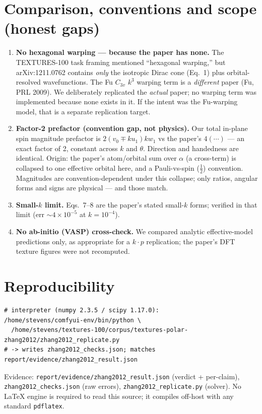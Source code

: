 \documentclass[11pt]{article}
\begin{document}
\section{Comparison, conventions and scope (honest gaps)}
\begin{enumerate}
\item \textbf{No hexagonal warping --- because the paper has none.} The TEXTURES-100 task
framing mentioned ``hexagonal warping,'' but arXiv:1211.0762 contains \emph{only} the
isotropic Dirac cone (Eq.~1) plus orbital-resolved wavefunctions. The Fu $C_{3v}$ $k^3$
warping term is a \emph{different} paper (Fu, PRL 2009). We deliberately replicated the
\emph{actual} paper; no warping term was implemented because none exists in it. If the
intent was the Fu-warping model, that is a separate replication target.
\item \textbf{Factor-2 prefactor (convention gap, not physics).} Our total in-plane spin
magnitude prefactor is $2(v_0\mp ku_1)kw_1$ vs the paper's $4(\cdots)$ --- an exact factor
of 2, constant across $k$ and $\theta$. Direction and handedness are identical. Origin: the
paper's atom/orbital sum over $\alpha$ (a cross-term) is collapsed to one effective orbital
here, and a Pauli-vs-spin ($\tfrac12$) convention. Magnitudes are convention-dependent under
this collapse; only ratios, angular forms and signs are physical --- and those match.
\item \textbf{Small-$k$ limit.} Eqs.~7--8 are the paper's stated small-$k$ forms; verified in
that limit (err $\sim4\times10^{-5}$ at $k=10^{-4}$).
\item \textbf{No ab-initio (VASP) cross-check.} We compared analytic effective-model
predictions only, as appropriate for a $k\!\cdot\!p$ replication; the paper's DFT texture
figures were not recomputed.
\end{enumerate}

\section{Reproducibility}
\begin{verbatim}
# interpreter (numpy 2.3.5 / scipy 1.17.0):
/home/stevens/comfyui-env/bin/python \
  /home/stevens/textures-100/corpus/textures-polar-zhang2012/zhang2012_replicate.py
# -> writes zhang2012_checks.json; matches report/evidence/zhang2012_result.json
\end{verbatim}
Evidence: \texttt{report/evidence/zhang2012\_result.json} (verdict + per-claim),
\texttt{zhang2012\_checks.json} (raw errors), \texttt{zhang2012\_replicate.py} (solver).
No LaTeX engine is required to read this source; it compiles off-host with any standard
\texttt{pdflatex}.
\end{document}
